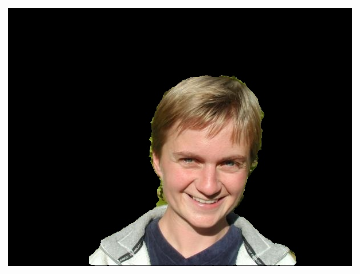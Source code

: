 \documentclass[a4paper,11]{article}
\begin{document}
\begin{center}
\begin{figure}[H]
\begin{subfigure}{0.33\textwidth}
      \includegraphics[width=0.9\linewidth]{results/person2}
    \end{subfigure}\\
    \vspace{1em}
    

\end{figure}
\end{center}
\end{document}
